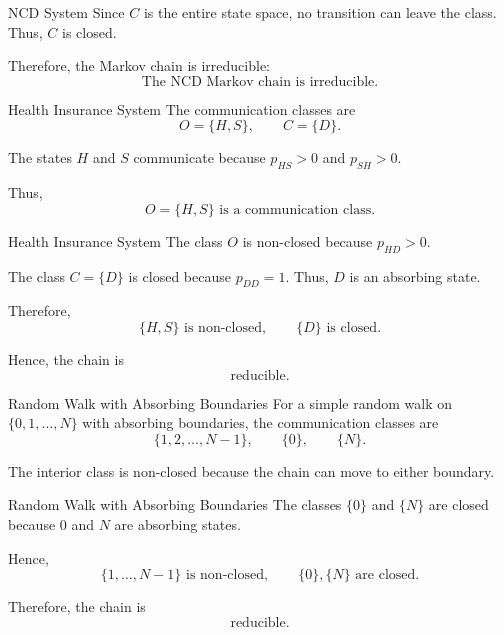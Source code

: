 \documentclass[
  ignorenonframetext,
  aspectratio=169,
]{beamer}
\begin{document}
\begin{frame}{NCD System}
\protect{}\label{ncd-system-1}
Since \(C\) is the entire state space, no transition can leave the
class. Thus, \(C\) is closed.

Therefore, the Markov chain is irreducible: \[
\boxed{\text{The NCD Markov chain is irreducible.}}
\]
\end{frame}

\begin{frame}{Health Insurance System}
\protect{}\label{health-insurance-system}
The communication classes are \[
O=\{H,S\},\qquad C=\{D\}.
\]

The states \(H\) and \(S\) communicate because \(p_{HS}>0\) and
\(p_{SH}>0\).

Thus, \[
\boxed{O=\{H,S\}\text{ is a communication class}.}
\]
\end{frame}

\begin{frame}{Health Insurance System}
\protect{}\label{health-insurance-system-1}
The class \(O\) is non-closed because \(p_{HD}>0\).

The class \(C=\{D\}\) is closed because \(p_{DD}=1\). Thus, \(D\) is an
absorbing state.

Therefore, \[
\boxed{\{H,S\}\text{ is non-closed},\qquad
\{D\}\text{ is closed}.}
\]

Hence, the chain is \[
\boxed{\text{reducible}.}
\]
\end{frame}

\begin{frame}{Random Walk with Absorbing Boundaries}
\protect{}\label{random-walk-with-absorbing-boundaries}
For a simple random walk on \(\{0,1,\ldots,N\}\) with absorbing
boundaries, the communication classes are \[
\boxed{\{1,2,\ldots,N-1\},\qquad \{0\},\qquad \{N\}.}
\]

The interior class is non-closed because the chain can move to either
boundary.
\end{frame}

\begin{frame}{Random Walk with Absorbing Boundaries}
\protect{}\label{random-walk-with-absorbing-boundaries-1}
The classes \(\{0\}\) and \(\{N\}\) are closed because \(0\) and \(N\)
are absorbing states.

Hence, \[
\boxed{\{1,\ldots,N-1\}\text{ is non-closed},\qquad
\{0\},\{N\}\text{ are closed}.}
\]

Therefore, the chain is \[
\boxed{\text{reducible}.}
\]
\end{frame}
\end{document}
